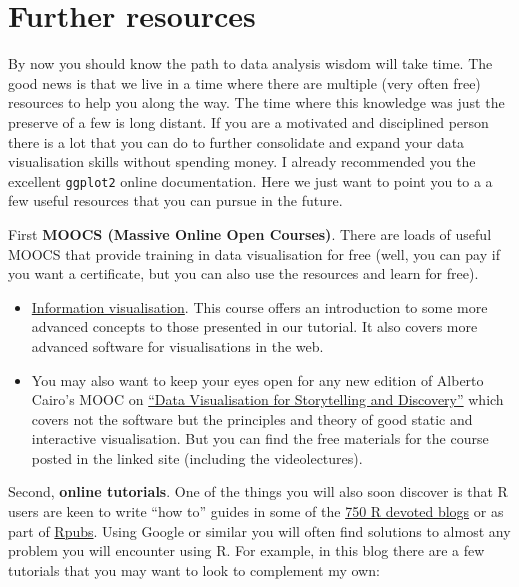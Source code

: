 \documentclass[
]{book}
\begin{document}
\hypertarget{further-resources}{%
\section{Further resources}\label{further-resources}}

By now you should know the path to data analysis wisdom will take time. The good news is that we live in a time where there are multiple (very often free) resources to help you along the way. The time where this knowledge was just the preserve of a few is long distant. If you are a motivated and disciplined person there is a lot that you can do to further consolidate and expand your data visualisation skills without spending money. I already recommended you the excellent \texttt{ggplot2} online documentation. Here we just want to point you to a a few useful resources that you can pursue in the future.

First \textbf{MOOCS (Massive Online Open Courses)}. There are loads of useful MOOCS that provide training in data visualisation for free (well, you can pay if you want a certificate, but you can also use the resources and learn for free).

\begin{itemize}
\item
  \href{https://www.coursera.org/specializations/information-visualization}{Information visualisation}. This course offers an introduction to some more advanced concepts to those presented in our tutorial. It also covers more advanced software for visualisations in the web.
\item
  You may also want to keep your eyes open for any new edition of Alberto Cairo's MOOC on \href{https://journalismcourses.org/data-viz-course-material.html}{``Data Visualisation for Storytelling and Discovery''} which covers not the software but the principles and theory of good static and interactive visualisation. But you can find the free materials for the course posted in the linked site (including the videolectures).
\end{itemize}

Second, \textbf{online tutorials}. One of the things you will also soon discover is that R users are keen to write ``how to'' guides in some of the \href{http://www.r-bloggers.com/}{750 R devoted blogs} or as part of \href{https://rpubs.com/}{Rpubs}. Using Google or similar you will often find solutions to almost any problem you will encounter using R. For example, in this blog there are a few tutorials that you may want to look to complement my own:
\end{document}
